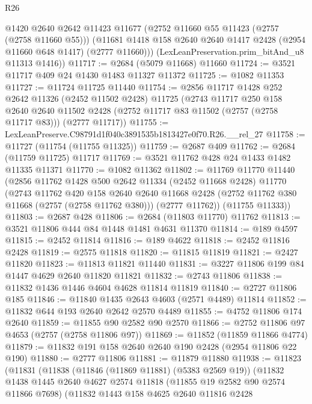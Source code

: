 \begin{lexlean}{R26}
\begin{coremodule}
        @1420
        @2640
        @2642
        @11423
        @11677
        (@2752 @11660 @55 @11423 (@2757 (@2758 @11660 @55)))
        (@11681 @1418 @158 @2640 @2640 @1417 @2428 (@2954 @11660 @648 @1417) (@2777 @11660)))
      (LexLeanPreservation.prim_bitAnd_u8 @11313 @1416))
@11717 := @2684 (@5079 @11668) @11660
@11724 := @3521 @11717 @409 @24 @1430 @1483 @11327 @11372
@11725 := @1082 @11353
@11727 := @11724 @11725 @11440
@11754 := @2856
    @11717
    @1428
    @252
    @2642
    @11326
    (@2452 @11502 @2428)
    @11725
    (@2743
      @11717
      @250
      @158
      @2640
      @2640
      @11502
      @2428
      (@2752 @11717 @83 @11502 (@2757 (@2758 @11717 @83)))
      (@2777 @11717))
@11755 := LexLeanPreserve.C98791d1f040c3891535b1813427e0f70.R26.__rel_27
@11758 := @11727 (@11754 (@11755 @11325))
@11759 := @2687 @409
@11762 := @2684 (@11759 @11725) @11717
@11769 := @3521 @11762 @428 @24 @1433 @1482 @11335 @11371
@11770 := @1082 @11362
@11802 := @11769
    @11770
    @11440
    (@2856
      @11762
      @1428
      @500
      @2642
      @11334
      (@2452 @11668 @2428)
      @11770
      (@2743
        @11762
        @420
        @158
        @2640
        @2640
        @11668
        @2428
        (@2752 @11762 @380 @11668 (@2757 (@2758 @11762 @380)))
        (@2777 @11762))
      (@11755 @11333))
@11803 := @2687 @428
@11806 := @2684 (@11803 @11770) @11762
@11813 := @3521 @11806 @444 @84 @1448 @1481 @4631 @11370
@11814 := @189 @4597
@11815 := @2452 @11814
@11816 := @189 @4622
@11818 := @2452 @11816 @2428
@11819 := @2575 @11818
@11820 := @11815 @11819
@11821 := @2427 @11820
@11823 := @11813 @11821 @11440
@11831 := @3227 @11806 @199 @84 @1447 @4629 @2640 @11820 @11821
@11832 := @2743 @11806
@11838 := @11832 @1436 @1446 @4604 @4628 @11814 @11819
@11840 := @2727 @11806 @185
@11846 := @11840 @1435 @2643 @4603 (@2571 @4489) @11814
@11852 := @11832 @644 @193 @2640 @2642 @2570 @4489
@11855 := @4752 @11806 @174 @2640
@11859 := @11855 @90 @2582 @90 @2570
@11866 := @2752 @11806 @97 @4653 (@2757 (@2758 @11806 @97))
@11869 := @11852 (@11859 @11866 @4774)
@11879 := @11832 @191 @158 @2640 @2640 @190 @2428 (@2954 @11806 @22 @190)
@11880 := @2777 @11806
@11881 := @11879 @11880
@11938 := @11823
    (@11831
      (@11838
        (@11846 (@11869 @11881) (@5383 @2569 @19))
        (@11832
          @1438
          @1445
          @2640
          @4627
          @2574
          @11818
          (@11855 @19 @2582 @90 @2574 @11866 @7698)
          (@11832
            @1443
            @158
            @4625
            @2640
            @11816
            @2428

\end{coremodule}
\end{lexlean}

